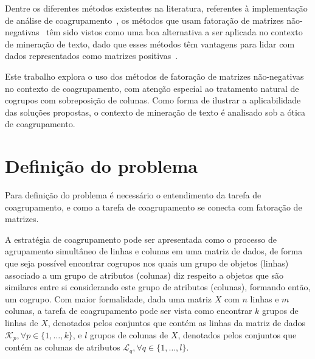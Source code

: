\documentclass[
    12pt,                %
    oneside,            %
    a4paper,            %
    english,            %
    brazil                %
    ]{abntex2ppgsi}
\begin{document}
Dentre os diferentes métodos existentes na literatura, referentes à implementação de análise de coagrupamento~\cite{Franca2010,Mirkin1996,Madeira2004}, os métodos que usam fatoração de matrizes não-negativas~\cite{lee:nnmf00,lee99} têm sido vistos como uma boa alternativa a ser aplicada no contexto de mineração de texto, dado que esses métodos têm vantagens para lidar com dados representados como matrizes positivas~\cite{Xu2003,Shahnaz2006373,Yoo2010}.

Este trabalho explora o uso dos métodos de fatoração de matrizes não-negativas no contexto de coagrupamento, com atenção especial ao tratamento natural de cogrupos com sobreposição de colunas.
Como forma de ilustrar a aplicabilidade das soluções propostas, o contexto de mineração de texto é analisado sob a ótica de coagrupamento.


\section{Definição do problema}
\label{sec:problemdef}




Para definição do problema é necessário o entendimento da tarefa de coagrupamento, e como a tarefa de coagrupamento se conecta com fatoração de matrizes.

A estratégia de coagrupamento pode ser apresentada como o processo de agrupamento simultâneo de linhas e colunas em uma matriz de dados, de forma que seja possível encontrar cogrupos nos quais um grupo de objetos (linhas) associado a um grupo de atributos (colunas) diz respeito a objetos que são similares entre si considerando este grupo de atributos (colunas), formando então, um cogrupo.
Com maior formalidade, dada uma matriz $X$ com $n$ linhas e $m$ colunas, a tarefa de coagrupamento pode ser vista como encontrar $k$ grupos de linhas de $X$, denotados pelos conjuntos que contém as linhas da matriz de dados $\mathcal{K}_p, \forall p \in \{1, \dots, k\}$, e $l$ grupos de colunas de $X$, denotados pelos conjuntos que contém as colunas de atributos $\mathcal{L}_q, \forall q \in \{1, \dots, l\}$.
\end{document}
